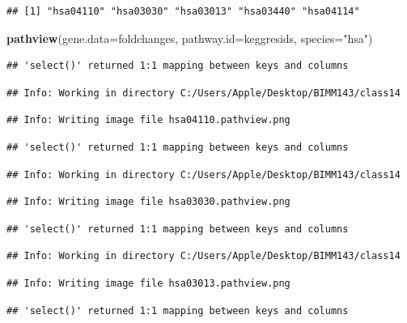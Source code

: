 \documentclass[
]{article}
\newenvironment{Shaded}{\begin{snugshade}}{\end{snugshade}}
\newcommand{\AttributeTok}[1]{\textcolor[rgb]{0.13,0.29,0.53}{#1}}
\newcommand{\FunctionTok}[1]{\textcolor[rgb]{0.13,0.29,0.53}{\textbf{#1}}}
\newcommand{\NormalTok}[1]{#1}
\newcommand{\StringTok}[1]{\textcolor[rgb]{0.31,0.60,0.02}{#1}}
\begin{document}
\begin{verbatim}
## [1] "hsa04110" "hsa03030" "hsa03013" "hsa03440" "hsa04114"
\end{verbatim}

\begin{Shaded}
\begin{Highlighting}[]
\FunctionTok{pathview}\NormalTok{(}\AttributeTok{gene.data=}\NormalTok{foldchanges, }\AttributeTok{pathway.id=}\NormalTok{keggresids, }\AttributeTok{species=}\StringTok{"hsa"}\NormalTok{)}
\end{Highlighting}
\end{Shaded}

\begin{verbatim}
## 'select()' returned 1:1 mapping between keys and columns
\end{verbatim}

\begin{verbatim}
## Info: Working in directory C:/Users/Apple/Desktop/BIMM143/class14
\end{verbatim}

\begin{verbatim}
## Info: Writing image file hsa04110.pathview.png
\end{verbatim}

\begin{verbatim}
## 'select()' returned 1:1 mapping between keys and columns
\end{verbatim}

\begin{verbatim}
## Info: Working in directory C:/Users/Apple/Desktop/BIMM143/class14
\end{verbatim}

\begin{verbatim}
## Info: Writing image file hsa03030.pathview.png
\end{verbatim}

\begin{verbatim}
## 'select()' returned 1:1 mapping between keys and columns
\end{verbatim}

\begin{verbatim}
## Info: Working in directory C:/Users/Apple/Desktop/BIMM143/class14
\end{verbatim}

\begin{verbatim}
## Info: Writing image file hsa03013.pathview.png
\end{verbatim}

\begin{verbatim}
## 'select()' returned 1:1 mapping between keys and columns
\end{verbatim}
\end{document}
